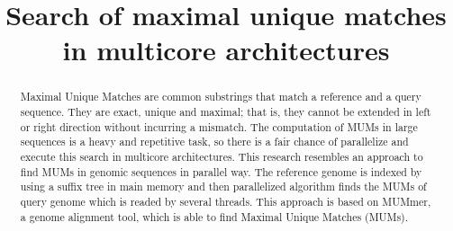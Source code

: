 \documentclass[3p,times]{elsarticle}
\begin{document}
\begin{frontmatter}




\title{Search of maximal unique matches in multicore architectures}


\author{}

\address{}

\begin{abstract}
  Maximal Unique Matches are common substrings that match a reference and a query sequence. They are exact, unique and maximal; that is, they cannot be extended in left or right direction without incurring a mismatch. The computation of MUMs in large sequences is a heavy and repetitive task, so there is a fair chance of parallelize and execute this search in multicore architectures. This research resembles an approach to find MUMs in genomic sequences in parallel way. The reference genome is indexed by using a suffix tree in main memory and then parallelized algorithm finds the MUMs of query genome which is readed by several threads. This approach is based on MUMmer, a genome alignment tool, which is able to find Maximal Unique Matches (MUMs). 
\end{abstract}

\begin{keyword}



\end{keyword}

\end{frontmatter}
\end{document}
